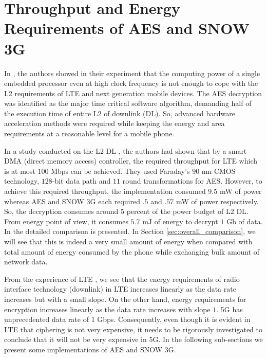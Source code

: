 \documentclass[lnicst,sechang,a4paper]{svmultln}
\begin{document}
\section{Throughput and Energy Requirements of AES and SNOW 3G}
\label{sec:throughput_and_energy_requirements_of_aes_snow3g}
In \cite{IIS_Ruhr_2009}, the authors showed in their experiment that the computing power of a single embedded processor even at high clock frequency is not enough to cope with the L2 requirements of LTE and next generation mobile devices. The AES decryption was identified as the major time critical software algorithm, demanding half of the execution time of entire L2 of downlink (DL). So, advanced hardware acceleration methods were required while keeping the energy and area requirements at a reasonable level for a mobile phone.

In a study conducted on the L2 DL \cite{IIS_Ruhr_2010}, the authors had shown that by a smart DMA (direct memory access) controller, the required throughput for LTE which is at most $100$ Mbps can be achieved. They used Faraday's $90$ nm CMOS technology, $128$-bit data path and $11$ round transformations for AES. However, to achieve this required throughput, the implementation consumed 9.5 mW of power whereas AES and SNOW 3G each required $.5$ and $.57$ mW of power respectively. So, the decryption consumes around 5 percent of the power budget of L2 DL. From energy point of view, it consumes $5.7$ mJ of energy to decrypt $1$ Gb of data. In \cite[Figure 6]{IIS_Ruhr_2010} the detailed comparison is presented. In Section \ref{sec:overall_comparison}, we will see that this is indeed a very small amount of energy when compared with total amount of energy consumed by the phone while exchanging bulk amount of network data.

From the experience of LTE \cite[Fig 9]{Mobisys_2012}, we see that the energy requirements of radio interface technology (downlink) in LTE increases linearly as the data rate increases but with a small slope. On the other hand, energy requirements for encryption increases linearly as the data rate increases with slope $1$. 5G has unprecedented data rate of 1 Gbps. Consequently, even though it is evident in LTE that ciphering is not very expensive, it needs to be rigorously investigated to conclude that it will not be very expensive in 5G. In the following sub-sections we present some implementations of AES and SNOW 3G.
\end{document}
